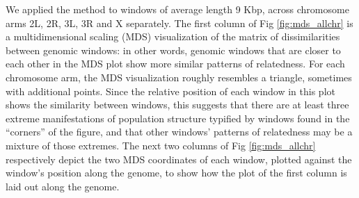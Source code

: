 \documentclass[11pt, oneside]{article}   	%
\newcommand{\Figure}{Fig }
\newcommand{\Figure}{{Figure }}
\begin{document}
We applied the method to windows of average length 9 Kbp, across chromosome arms 2L, 2R, 3L, 3R and X separately.
The first column of \Figure \ref{fig:mds_allchr} is a multidimensional scaling (MDS) visualization 
of the matrix of dissimilarities between genomic windows:
in other words, genomic windows that are closer to each other in the MDS plot show more similar patterns of relatedness.
For each chromosome arm, the MDS visualization roughly resembles a triangle,
sometimes with additional points.
Since the relative position of each window in this plot shows the similarity between windows, 
this suggests that there are at least three extreme manifestations of population structure 
typified by windows found in the ``corners'' of the figure,
and that other windows' patterns of relatedness may be a mixture of those extremes. 
The next two columns of \Figure \ref{fig:mds_allchr} respectively depict the two MDS coordinates of each window,
plotted against the window's position along the genome,
to show how the plot of the first column is laid out along the genome.
\end{document}

